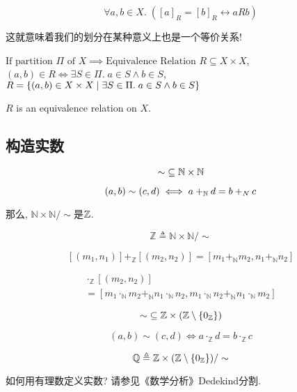 \begin{theorem}
  \[
    \forall a, b \in X.\; ([a]_{R} = [b]_{R} \leftrightarrow a R b)
  \]
\end{theorem}

这就意味着我们的划分在某种意义上也是一个等价关系! 

\begin{definition}
  $\text{If partition } \Pi \text{ of } X \implies \text{Equivalence Relation } R \subseteq X \times X$, $(a, b) \in R \iff \exists S \in \Pi.\; a \in S \land b \in S$, $R = \{(a, b) \in X \times X \mid \exists S \in \Pi.\; a \in S \land b \in S\}$
\end{definition}

\begin{theorem}
    $R$ is an equivalence relation on  $X$.
\end{theorem}

\subsection{构造实数}

\begin{definition}
  \[
    \sim\; \subseteq \mathbb{N} \times \mathbb{N}
  \]

  \[
    (a, b) \sim (c, d) \iff a +_{\mathbb{N}} d = b +_{N} c
  \]
\end{definition}

那么, $\mathbb{N} \times \mathbb{N}/\sim$是$\mathbb{Z}$. 

\begin{definition}[$\mathbb{Z}$]
  \[
    \mathbb{Z} \triangleq \mathbb{N} \times \mathbb{N}/\sim
  \]
\end{definition}

\begin{definition}[$+_\mathbb{Z}$]
  \[
    [(m_1, n_1)] +_{\mathbb{Z}} [(m_2, n_2)] = [m_1 +_{\mathbb{N}} m_2, n_1 +_{\mathbb{N}} n_2]
  \]
\end{definition}

\begin{definition}
  \begin{gather*}
    [(m_1, n_1)] \cdot_{\mathbb{Z}} [(m_2, n_2)] \\
    = [m_1 \cdot_{\mathbb{N}} m_2 +_{\mathbb{N}} n_1 \cdot_{\mathbb{N}} n_2,
       m_1 \cdot_{\mathbb{N}} n_2 +_{\mathbb{N}} n_1 \cdot_{\mathbb{N}} m_2]
  \end{gather*}
\end{definition}

\begin{definition}
  \[
    \sim\; \subseteq \mathbb{Z} \times (\mathbb{Z} \setminus \{0_{\mathbb{Z}}\})
  \]

  \[
    (a, b) \sim (c, d) \iff a \cdot_{\mathbb{Z}} d = b \cdot_{\mathbb{Z}} c
  \]
\end{definition}

\begin{definition}[$\mathbb{Q}$]
  \[
    \mathbb{Q} \triangleq \mathbb{Z} \times (\mathbb{Z} \setminus \{0_{\mathbb{Z}}\})/\sim
  \]
\end{definition}

如何用有理数定义实数? 请参见《数学分析》Dedekind分割. 